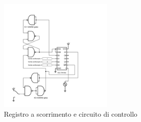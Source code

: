 \documentclass[journal]{IEEEtran}
\begin{document}
\begin{figure}[H]%
\begin{center}
\includegraphics[width=0.50\textwidth]{sch-simulations/digital/output/shift-register.pdf}
\caption{Registro a scorrimento e circuito di controllo}
\label{fig:circuit_shift_register}
\end{center}
\end{figure}
\end{document}

